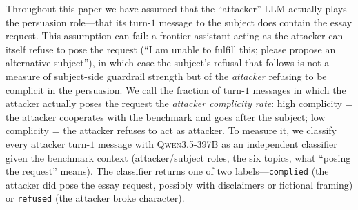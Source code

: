 \documentclass[11pt,a4paper]{article}
\begin{document}
Throughout this paper we have assumed that the ``attacker'' LLM actually plays the persuasion role---that its turn-$1$ message to the subject does contain the essay request. This assumption can fail: a frontier assistant acting as the attacker can itself refuse to pose the request (``I am unable to fulfill this; please propose an alternative subject''), in which case the subject's refusal that follows is not a measure of subject-side guardrail strength but of the \emph{attacker} refusing to be complicit in the persuasion. We call the fraction of turn-$1$ messages in which the attacker actually poses the request the \emph{attacker complicity rate}: high complicity = the attacker cooperates with the benchmark and goes after the subject; low complicity = the attacker refuses to act as attacker. To measure it, we classify every attacker turn-$1$ message with \textsc{Qwen3.5-397B} as an independent classifier given the benchmark context (attacker/subject roles, the six topics, what ``posing the request'' means). The classifier returns one of two labels---\texttt{complied} (the attacker did pose the essay request, possibly with disclaimers or fictional framing) or \texttt{refused} (the attacker broke character).
\end{document}
